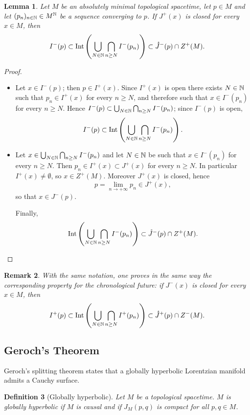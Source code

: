 \documentclass[a4paper,twoside]{article}
\newtheorem{lem}{Lemma}[section]
\newtheorem{defi}[lem]{Definition}
\newtheorem{rem}[lem]{Remark}
\begin{document}
\begin{lem}\label{lem:cup_cap} Let $M$ be an absolutely minimal topological spacetime, let $p\in M$ and let $(p_n)_{n\in \mathbb{N}}\in M^{\mathbb{N}}$ be a sequence converging to
$p$.
If $J^+(x)$ is closed for every $x\in M$, then
$$I^{-}(p)\subset \mathrm{Int}\left(\bigcup_{N\in \N}\bigcap_{n\geq N} I^-(p_n)\right)\subset \ring J^-(p) \cap Z^{+}(M). $$
\end{lem}
\begin{proof} \
\begin{itemize}
\item Let $x\in I^-(p)$; then $p\in I^+(x)$. Since $I^+(x)$ is open there exists $N\in \mathbb{N}$ such that $p_n\in I^+(x)$ for every $n\geq N$,
and therefore such that $x\in I^-(p_n)$ for every $n\geq N$.
Hence $I^-(p)\subset \bigcup_{N\in \mathbb{N}}\bigcap_{n\geq N} I^-(p_n)$;
since $I^-(p)$ is open, $$I^{-}(p)\subset \mathrm{Int}\left(\bigcup_{N\in \mathbb{N}}\bigcap_{n\geq N} I^-(p_n)\right).$$

\item Let $x\in \bigcup_{N\in \mathbb{N}}\bigcap_{n\geq N} I^-(p_n)$ and let $N\in \mathbb{N}$ be such that
$x\in I^-(p_n)$ for every $n\geq N$.
Then $p_n\in I^+(x)\subset J^+(x)$ for every $n\geq N$.
In particular $I^+(x)\neq \emptyset$, so $x\in Z^+(M)$.
Moreover $J^+(x)$ is closed, hence
$$p=\lim_{n\rightarrow +\infty } p_n \in J^+(x),$$
so that $x\in J^-(p)$.

Finally,
$$\mathrm{Int}\left(\bigcup_{N\in \N}\bigcap_{n\geq N} I^-(p_n)\right)\subset \ring J^-(p)\cap Z^+(M).$$
\end{itemize}
\end{proof}

\begin{rem}\label{rem:same_notation_one_proves} With the same notation, one proves in the same way the corresponding property for the chronological future:
if $J^-(x)$ is closed for every $x\in M$, then
$$I^{+}(p)\subset \mathrm{Int}\left(\bigcup_{N\in \N}\bigcap_{n\geq N} I^+(p_n)\right)\subset \ring J^+(p) \cap Z^{-}(M). $$
\end{rem}

\subsection{Geroch's Theorem}
Geroch's splitting theorem states that a globally hyperbolic Lorentzian manifold admits a Cauchy surface.

\begin{defi}[Globally hyperbolic]\label{def:globally_hyperbolic} Let $M$ be a topological spacetime. $M$ is globally hyperbolic if $M$ is causal and
if $J_M(p,q)$ is compact for all $p,q\in M$.
\end{defi}
\end{document}
